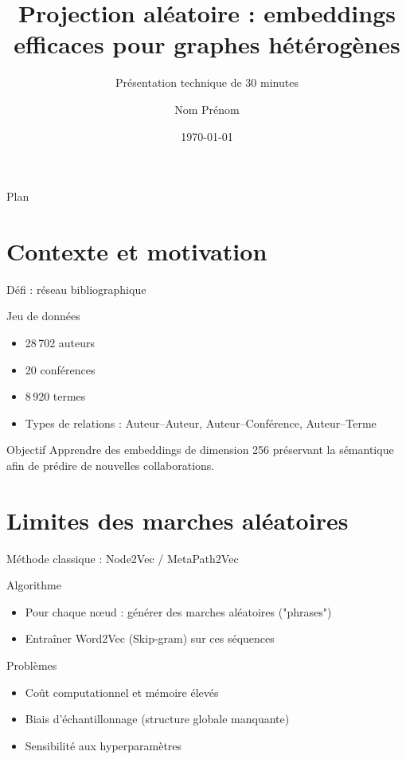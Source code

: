 \documentclass[9pt,aspectratio=169,professionalfonts]{beamer}
\title[Projection aléatoire]{Projection aléatoire : embeddings efficaces pour graphes hétérogènes}
\subtitle{Présentation technique de 30 minutes}
\author{Nom Prénom}
\institute{Institution}
\date{\today}
\begin{document}
\begin{frame}
  \titlepage
\end{frame}

\begin{frame}{Plan}
  \tableofcontents
\end{frame}

\section{Contexte et motivation}

\begin{frame}{Défi : réseau bibliographique}
\begin{block}{Jeu de données}
\begin{itemize}
  \item 28\,702 auteurs
  \item 20 conférences
  \item 8\,920 termes
  \item Types de relations : Auteur–Auteur, Auteur–Conférence, Auteur–Terme
\end{itemize}
\end{block}
\begin{block}{Objectif}
Apprendre des embeddings de dimension 256 préservant la sémantique afin de prédire de nouvelles collaborations.
\end{block}
\end{frame}

\section{Limites des marches aléatoires}

\begin{frame}{Méthode classique : Node2Vec / MetaPath2Vec}
\begin{block}{Algorithme}
\begin{itemize}
  \item Pour chaque nœud : générer des marches aléatoires ("phrases")
  \item Entraîner Word2Vec (Skip-gram) sur ces séquences
\end{itemize}
\end{block}
\begin{alertblock}{Problèmes}
\begin{itemize}
  \item Coût computationnel et mémoire élevés
  \item Biais d'échantillonnage (structure globale manquante)
  \item Sensibilité aux hyperparamètres
\end{itemize}
\end{alertblock}
\end{frame}
\end{document}
